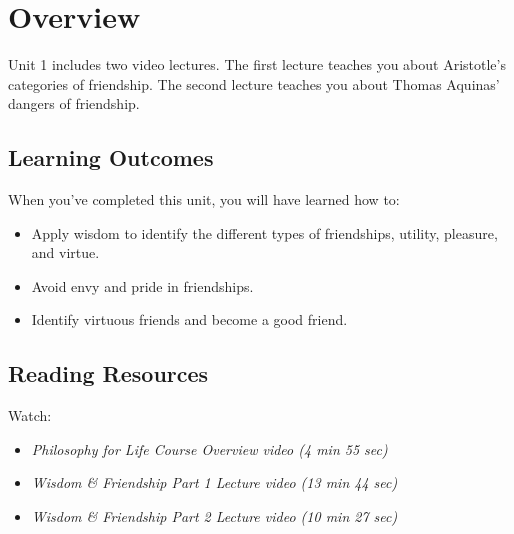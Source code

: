 \documentclass[
]{book}
\providecommand{\tightlist}{%
  \setlength{\itemsep}{0pt}\setlength{\parskip}{0pt}}
\begin{document}
\hypertarget{overview}{%
\section*{Overview}\label{overview}}

Unit 1 includes two video lectures. The first lecture teaches you about Aristotle's categories of friendship. The second lecture teaches you about Thomas Aquinas' dangers of friendship.

\hypertarget{learning-outcomes}{%
\subsection*{Learning Outcomes}\label{learning-outcomes}}

When you've completed this unit, you will have learned how to:

\begin{itemize}
\tightlist
\item
  Apply wisdom to identify the different types of friendships, utility, pleasure, and virtue.
\item
  Avoid envy and pride in friendships.
\item
  Identify virtuous friends and become a good friend.
\end{itemize}

\hypertarget{reading-resources}{%
\subsection*{Reading Resources}\label{reading-resources}}

Watch:

\begin{itemize}
\tightlist
\item
  \emph{Philosophy for Life Course Overview video (4 min 55 sec)}
\end{itemize}

\begin{itemize}
\tightlist
\item
  \emph{Wisdom \& Friendship Part 1 Lecture video (13 min 44 sec)}
\end{itemize}

\begin{itemize}
\tightlist
\item
  \emph{Wisdom \& Friendship Part 2 Lecture video (10 min 27 sec)}
\end{itemize}
\end{document}
